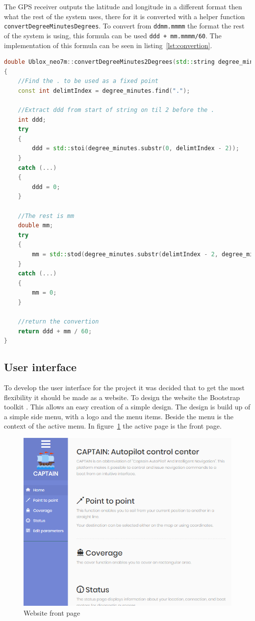 The GPS receiver outputs the latitude and longitude in a different format then what the rest of the system uses, there for it is converted with a helper function \texttt{convert\-Degree\-Minutes\-Degrees}. To convert from \texttt{ddmm.mmmm} the format the rest of the system is using, this formula can be used \texttt{ddd + mm.mmmm/60}\cite{convertion}. The implementation of this formula can be seen in listing~\ref{lst:convertion}.


\begin{lstlisting}[caption = {Convertion between latitude longitude formats}, captionpos=b, label={lst:convertion}, language=C++,firstnumber=1]
double Ublox_neo7m::convertDegreeMinutes2Degrees(std::string degree_minutes) const
{
	//Find the . to be used as a fixed point
	const int delimtIndex = degree_minutes.find(".");
	
	//Extract ddd from start of string on til 2 before the .
	int ddd;
	try
	{
		ddd = std::stoi(degree_minutes.substr(0, delimtIndex - 2));
	}
	catch (...)
	{
		ddd = 0;
	}
	
	//The rest is mm
	double mm;
	try
	{
		mm = std::stod(degree_minutes.substr(delimtIndex - 2, degree_minutes.length() - 1));
	}
	catch (...)
	{
		mm = 0;
	}
	
	//return the convertion
	return ddd + mm / 60;
}
\end{lstlisting}

\subsection{User interface}
To develop the user interface for the project it was decided that to get the most flexibility it should be made as a website. To design the website the Bootstrap toolkit \cite{bootstrap}. This allows an easy creation of a simple design.
The design is build up of a simple side menu, with a logo and the menu items. Beside the menu is the context of the active menu. In figure~\ref{fig:frontpage} the active page is the front page.

\begin{figure}[H]
\centering
\includegraphics[width=0.7\linewidth]{Images/Implementation/frontpage}
\caption{Website front page}
\label{fig:frontpage}
\end{figure}

